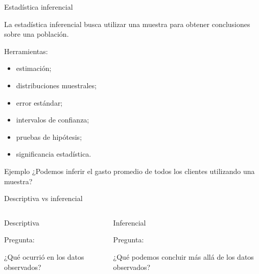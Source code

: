 \documentclass[aspectratio=169,11pt]{beamer}
\begin{document}
\begin{frame}{Estadística inferencial}

La estadística inferencial busca utilizar una muestra para obtener
conclusiones sobre una población.

\vspace{0.4cm}

Herramientas:

\begin{itemize}

    \item estimación;

    \item distribuciones muestrales;

    \item error estándar;

    \item intervalos de confianza;

    \item pruebas de hipótesis;

    \item significancia estadística.

\end{itemize}

\vspace{0.4cm}

\begin{exampleblock}{Ejemplo}
¿Podemos inferir el gasto promedio de todos los clientes utilizando una muestra?
\end{exampleblock}

\end{frame}


\begin{frame}{Descriptiva vs inferencial}

\begin{columns}


\begin{block}{Descriptiva}

Pregunta:

\begin{center}
¿Qué ocurrió en los datos observados?
\end{center}

\end{block}


\begin{exampleblock}{Inferencial}

Pregunta:

\begin{center}
¿Qué podemos concluir más allá de los datos observados?
\end{center}

\end{exampleblock}

\end{columns}

\end{frame}
\end{document}
